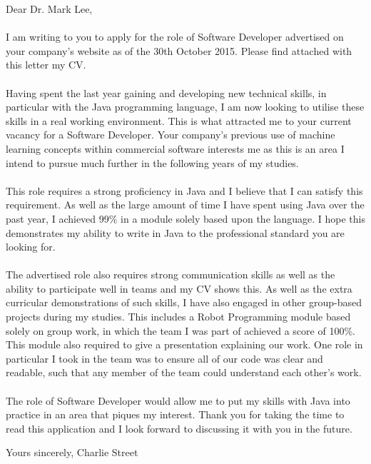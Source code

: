 \documentclass[12pt]{article}
\begin{document}
	\begin{flushleft}
		Dear Dr. Mark Lee, 
		\paragraph{}
			I am writing to you to apply for the role of Software Developer advertised on your company's website as of the 30th October 2015. Please find attached with this letter my CV.
	
		\paragraph{}
			Having spent the last year gaining and developing new technical skills, in particular with the Java programming language, I am now looking to utilise these skills in a real working environment. This is what attracted me to your current vacancy for a Software Developer. Your company's previous use of machine learning concepts within commercial software interests me as this is an area I intend to pursue much further in the following years of my studies.

		\paragraph{}
			This role requires a strong proficiency in Java and I believe that I can satisfy this requirement. As well as the large amount of time I have spent using Java over the past year, I achieved 99\% in a module solely based upon the language. I hope this demonstrates my ability to write in Java to the professional standard you are looking for.

		\paragraph{}
			The advertised role also requires strong communication skills as well as the ability to participate well in teams and my CV shows this. As well as the extra curricular demonstrations of such skills, I have also engaged in other group-based projects during my studies. This includes a Robot Programming module based solely on group work, in which the team I was part of achieved a score of 100\%. This module also required to give a presentation explaining our work. One role in particular I took in the team was to ensure all of our code was clear and readable, such that any member of the team could understand each other's work.

		\paragraph{}
			The role of Software Developer would allow me to put my skills with Java into practice in an area that piques my interest. Thank you for taking the time to read this application and I look forward to discussing it with you in the future.\\

		
	\end{flushleft}
	\begin{flushleft}
		Yours sincerely,
		\newline
		\break
		Charlie Street
	\end{flushleft}
\end{document}
